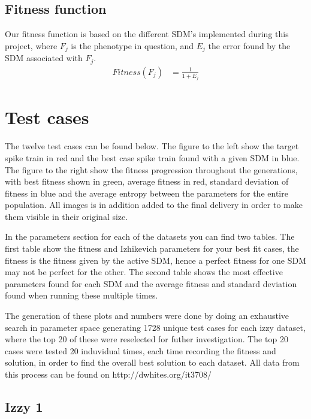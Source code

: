 \documentclass[10pt]{article}
\begin{document}
	\subsection{Fitness function}\label{sec:fitness}
		Our fitness function is based on the different SDM's implemented during this project, where $F_j$ is the phenotype in question, and $E_j$ the error found by the SDM associated with $F_j$.
		\begin{align}
			Fitness(F_j) &= \frac{1}{1+E_j}\nonumber
		\end{align}
\section{Test cases}\label{sec:test}
	The twelve test cases can be found below. The figure to the left show the target spike train in red and the best case spike train found with a given SDM in blue. The figure to the right show the fitness progression throughout the generations, with best fitness shown in green, average fitness in red, standard deviation of fitness in blue and the average entropy between the parameters for the entire population. All images is in addition added to the final delivery in order to make them visible in their original size. 
	
	In the parameters section for each of the datasets you can find two tables. The first table show the fitness and Izhikevich parameters for your best fit cases, the fitness is the fitness given by the active SDM, hence a perfect fitness for one SDM may not be perfect for the other. The second table shows the most effective parameters found for each SDM and the average fitness and standard deviation found when running these multiple times. 
	
	The generation of these plots and numbers were done by doing an exhaustive search in parameter space generating 1728 unique test cases for each izzy dataset, where the top 20 of these were reselected for futher investigation. The top 20 cases were tested 20 induvidual times, each time recording the fitness and solution, in order to find the overall best solution to each dataset. All data from this process can be found on http://dwhites.org/it3708/
	
	\subsection{Izzy 1}
\end{document}
